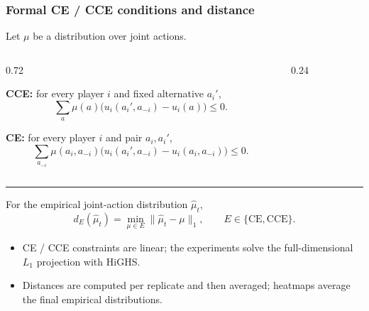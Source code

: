 \begin{frame}[noframenumbering]
  \frametitle{Formal CE / CCE conditions and distance}

  \vspace{-0.10cm}
  \small
  Let $\mu$ be a distribution over joint actions.

  \vspace{0.20cm}

  \begin{columns}[c,onlytextwidth]

    \begin{column}{0.72\textwidth}
      \scriptsize
      
      \textbf{CCE:} for every player $i$ and fixed alternative $a_i'$,\\[-0.15cm]
      \[
        \sum_a \mu(a)
        \bigl(u_i(a_i',a_{-i})-u_i(a)\bigr)\le 0.
      \]

      \vspace{-0.20cm}

      \textbf{CE:} for every player $i$ and pair $a_i,a_i'$,\\[-0.15cm]
      \[
        \sum_{a_{-i}}\mu(a_i,a_{-i})
        \bigl(u_i(a_i',a_{-i})-u_i(a_i,a_{-i})\bigr)\le0.
      \]

    \end{column}

    \begin{column}{0.24\textwidth}
      \small
      \raggedright
      \setlength{\fboxsep}{0.16cm}
      \setlength{\fboxrule}{0.45pt}

      \hspace*{-1cm}
    \end{column}

  \end{columns}

  \vspace{0.10cm}
  \textcolor{TUMblue}{\rule{\linewidth}{0.35pt}}
  \vspace{-0.40cm}

  \small
  For the empirical joint-action distribution $\hat\mu_t$,
  \[
    d_E(\hat\mu_t)=\min_{\mu\in E}\|\hat\mu_t-\mu\|_1,
    \qquad E\in\{\mathrm{CE},\mathrm{CCE}\}.
  \]

  \vspace{-0.20cm}
  \begin{itemize}
    \setlength{\itemsep}{-0.05cm}
    \item CE / CCE constraints are linear; the experiments solve the full-dimensional $L_1$ projection with HiGHS.
    \item Distances are computed per replicate and then averaged; heatmaps average the final empirical distributions.
  \end{itemize}
\end{frame}

